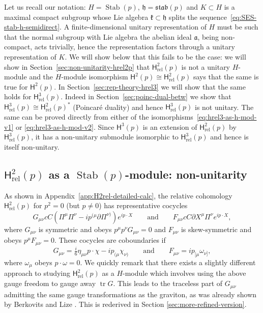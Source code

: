 \documentclass[11pt,reqno,a4paper,final]{amsart}
\theoremstyle{plain}
\theoremstyle{definition}
\newcommand{\h}{\mathfrak{h}}
\newcommand{\fa}{\mathfrak{a}}
\newcommand{\fk}{\mathfrak{k}}
\renewcommand{\d}{\partial}
\newcommand{\sH}{\mathsf{H}}
\newcommand{\Hrel}{\mathsf{H}_{\mathrm{rel}}}
\newcommand{\Stab}{\operatorname{Stab}}
\newcommand{\stab}{\mathfrak{stab}}
\newcommand{\tr}{\operatorname{tr}}
\newcommand{\1}{\mathbb{1}}
\numberwithin{equation}{section}
\begin{document}
Let us recall our notation: $H = \Stab(p)$, $\h = \stab(p)$ and
$K \subset H$ is a maximal compact subgroup whose Lie algebra
$\fk \subset \h$ splits the sequence~\eqref{eq:SES-stab-h-semidirect}.
A finite-dimensional unitary representation of $H$ must be such that
the normal subgroup with Lie algebra the abelian ideal $\fa$, being
non-compact, acts trivially, hence the representation factors through
a unitary representation of $K$. We will show below that this fails to
be the case: we will show in Section~\ref{sec:non-unitarity-hrel2p}
that $\Hrel^2(p)$ is not a unitary $H$-module and the $H$-module
isomorphism $\sH^2(p) \cong \Hrel^2(p)$ says that the same is true for
$\sH^2(p)$. In Section~\ref{sec:rep-theory-hrel3} we will show that
the same holds for $\Hrel^3(p)$. Indeed in
Section~\ref{sec:poinc-dual-betw} we show that
$\Hrel^3(p) \cong \Hrel^2(p)^*$ (Poincaré duality) and hence
$\Hrel^3(p)$ is not unitary. The same can be proved directly from
either of the isomorphisms~\eqref{eq:hrel3-as-h-mod-v1} or
\eqref{eq:hrel3-as-h-mod-v2}. Since $\sH^3(p)$ is an extension of
$\Hrel^2(p)$ by $\Hrel^3(p)$, it has a non-unitary submodule
isomorphic to $\Hrel^3(p)$ and hence is itself non-unitary.

\subsection{$\Hrel^2(p)$ as a $\Stab(p)$-module: non-unitarity}
\label{sec:rep-theory-hrel2}

As shown in Appendix~\ref{app:H2rel-detailed-calc}, the relative
cohomology $\Hrel^2(p)$ for $p^2 =0$ (but $p\neq 0$) has
representative cocycles
\begin{equation}
  G_{\mu\nu} c C (\Pi^\mu \Pi^\nu -i p^{(\mu} \d \Pi^{\nu)}) e^{i   p\cdot X}  \qquad\text{and}\qquad F_{\mu\nu} c C \d X^\mu \Pi^\nu  e^{i p \cdot X},
\end{equation}
where $G_{\mu\nu}$ is symmetric and obeys $p^\mu p^\nu G_{\mu\nu}= 0$
and $F_{\mu\nu}$ is skew-symmetric and obeys $p^\mu F_{\mu\nu}= 0$.
These cocycles are coboundaries if
\begin{equation}
  G_{\mu\nu} = \tfrac{i}6 \eta_{\mu\nu} p \cdot \chi - i p_{(\mu}  \chi_{\nu)}\qquad\text{and}\qquad F_{\mu\nu} = i p_{[\mu} \omega_{\nu]},
\end{equation}
where $\omega_\mu$ obeys $p \cdot \omega = 0$.  We quickly remark that
there exists a slightly different approach to studying $\Hrel^2(p)$ as
a $H$-module which involves using the above gauge freedom to gauge
away $\tr G$. This leads to the traceless part of $G_{\mu\nu}$
admitting the same gauge transformations as the graviton, as was
already shown by Berkovits and Lize \cite{Berkovits:2018jvm}. This is
rederived in Section \ref{sec:more-refined-version}.
\end{document}

